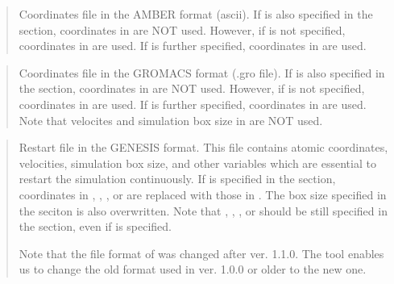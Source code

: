 \documentclass[a4paper,11pt,oneside,english]{sphinxmanual}
\begin{document}
\begin{quote}

Coordinates file in the AMBER format (ascii).
If  is also specified in the \sphinxstylestrong{{[}INPUT{]}} section, coordinates in  are NOT used.
However, if  is not specified, coordinates in  are used.
If  is further specified, coordinates in  are used.
\end{quote}

\begin{quote}

Coordinates file in the GROMACS format (.gro file).
If  is also specified in the \sphinxstylestrong{{[}INPUT{]}} section, coordinates in  are NOT used.
However, if  is not specified, coordinates in  are used.
If  is further specified, coordinates in  are used.
Note that velocites and simulation box size in  are NOT used.
\end{quote}

\begin{quote}

Restart file in the GENESIS format.
This file contains atomic coordinates, velocities, simulation box size, and
other variables which are essential to restart the simulation continuously.
If  is specified in the \sphinxstylestrong{{[}INPUT{]}} section, coordinates in
, , , or  are replaced with those in .
The box size specified in the \sphinxstylestrong{{[}BOUNDARY{]}} seciton is also overwritten.
Note that , , , or  should be still specified
in the \sphinxstylestrong{{[}INPUT{]}} section, even if  is specified.

Note that the file format of  was changed after ver. 1.1.0.
The  tool enables us to change
the old format used in ver. 1.0.0 or older to the new one.
\end{quote}
\end{document}
